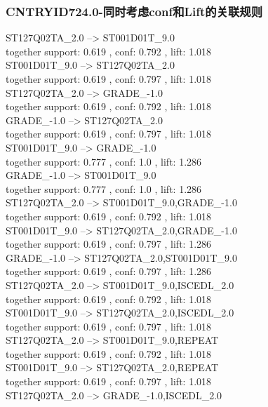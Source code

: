 \documentclass[12pt, a4paper, oneside]{ctexart}
\begin{document}
\subsubsection{CNTRYID724.0-同时考虑conf和Lift的关联规则 } 
ST127Q02TA\_2.0 --> ST001D01T\_9.0 \\
  together support: 0.619 , conf: 0.792 , lift: 1.018\\
ST001D01T\_9.0 --> ST127Q02TA\_2.0 \\
  together support: 0.619 , conf: 0.797 , lift: 1.018\\
ST127Q02TA\_2.0 --> GRADE\_-1.0 \\
  together support: 0.619 , conf: 0.792 , lift: 1.018\\
GRADE\_-1.0 --> ST127Q02TA\_2.0 \\
  together support: 0.619 , conf: 0.797 , lift: 1.018\\
ST001D01T\_9.0 --> GRADE\_-1.0 \\
  together support: 0.777 , conf: 1.0 , lift: 1.286\\
GRADE\_-1.0 --> ST001D01T\_9.0 \\
  together support: 0.777 , conf: 1.0 , lift: 1.286\\
ST127Q02TA\_2.0 --> ST001D01T\_9.0,GRADE\_-1.0 \\
  together support: 0.619 , conf: 0.792 , lift: 1.018\\
ST001D01T\_9.0 --> ST127Q02TA\_2.0,GRADE\_-1.0 \\
 together support: 0.619 , conf: 0.797 , lift: 1.286\\
GRADE\_-1.0 --> ST127Q02TA\_2.0,ST001D01T\_9.0 \\
 together support: 0.619 , conf: 0.797 , lift: 1.286\\
ST127Q02TA\_2.0 --> ST001D01T\_9.0,ISCEDL\_2.0 \\
  together support: 0.619 , conf: 0.792 , lift: 1.018\\
ST001D01T\_9.0 --> ST127Q02TA\_2.0,ISCEDL\_2.0 \\
  together support: 0.619 , conf: 0.797 , lift: 1.018\\
ST127Q02TA\_2.0 --> ST001D01T\_9.0,REPEAT \\
  together support: 0.619 , conf: 0.792 , lift: 1.018\\
ST001D01T\_9.0 --> ST127Q02TA\_2.0,REPEAT \\
  together support: 0.619 , conf: 0.797 , lift: 1.018\\
ST127Q02TA\_2.0 --> GRADE\_-1.0,ISCEDL\_2.0 \\
\end{document}
